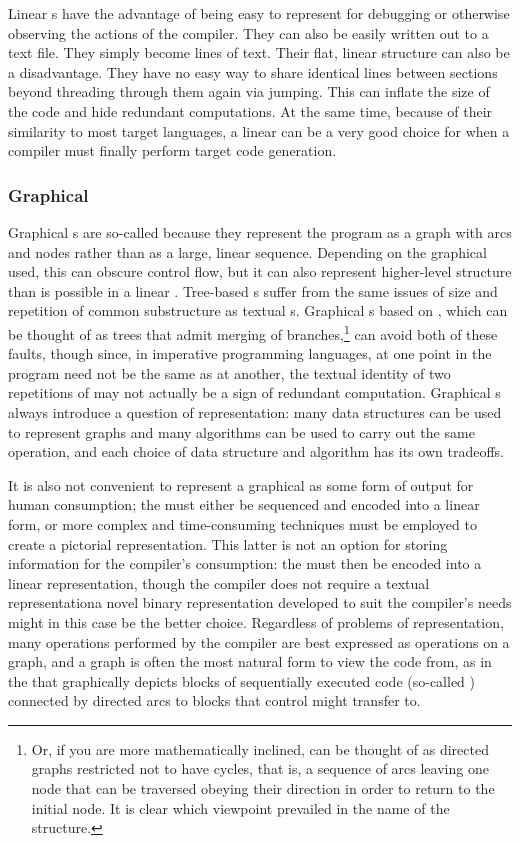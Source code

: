 Linear s have the advantage of being easy to represent for debugging or otherwise observing the actions of the compiler. They can also be easily written out to a text file. They simply become lines of text. Their flat, linear structure can also be a disadvantage. They have no easy way to share identical lines between sections beyond threading through them again via jumping. This can inflate the size of the  code and hide redundant computations. At the same time, because of their similarity to most target languages, a linear  can be a very good choice for when a compiler must finally perform target code generation.

\subsubsection{Graphical}
Graphical s are so-called because they represent the program as a graph with arcs and nodes rather than as a large, linear sequence. Depending on the graphical  used, this can obscure control flow, but it can also represent higher-level structure than is possible in a linear . Tree-based s suffer from the same issues of size and repetition of common substructure as textual s. Graphical s based on , which can be thought of as trees that admit merging of branches,\footnote{Or, if you are more mathematically inclined, can be thought of as directed graphs restricted not to have cycles, that is, a sequence of arcs leaving one node that can be traversed obeying their direction in order to return to the initial node. It is clear which viewpoint prevailed in the name of the structure.} can avoid both of these faults, though since, in imperative programming languages,  at one point in the program need not be the same as  at another, the textual identity of two repetitions of  may not actually be a sign of redundant computation. Graphical s always introduce a question of representation: many data structures can be used to represent graphs and many algorithms can be used to carry out the same operation, and each choice of data structure and algorithm has its own tradeoffs.

It is also not convenient to represent a graphical  as some form of output for human consumption; the  must either be sequenced and encoded into a linear form, or more complex and time-consuming techniques must be employed to create a pictorial representation. This latter is not an option for storing information for the compiler's consumption: the  must then be encoded into a linear representation, though the compiler does not require a textual representation\empause a novel binary representation developed to suit the compiler's needs might in this case be the better choice. Regardless of problems of representation, many operations performed by the compiler are best expressed as operations on a graph, and a graph is often the most natural form to view the code from, as in the  that graphically depicts blocks of sequentially executed code (so-called ) connected by directed arcs to blocks that control might transfer to.

